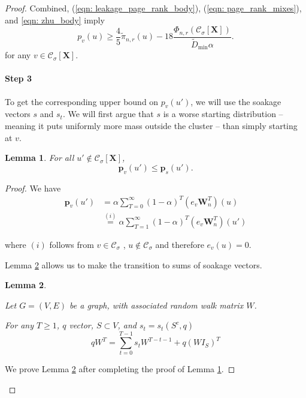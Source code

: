 \documentclass{article}
\newcommand{\1}{\mathbf{1}}
\newcommand{\pbf}{\mathbf{p}}
\newcommand{\Xbf}{\mathbf{X}}
\newcommand{\Wbf}{\mathbf{W}}
\newcommand{\Cset}{\mathcal{C}}
\newcommand{\Csig}{\Cset_{\sigma}}
\theoremstyle{aldenthm}
\newtheorem{lemma}{Lemma}
\begin{document}
\begin{proof}
	
	Combined, (\ref{eqn: leakage_page_rank_body}), (\ref{eqn: page_rank_mixes}), and \eqref{eqn: zhu_body} imply
	\begin{equation*}
	p_v(u) \geq \frac{4}{5} \widetilde{\pi}_{n,r}(u) - 18\frac{ \Phi_{n,r}(\Csig[\Xbf])}{\widetilde{D}_{\min} \alpha}.
	\end{equation*}
	for any $v \in \Csig[\Xbf]$. 
	
	\paragraph{Step 3}
	To get the corresponding upper bound on $p_v(u')$, we will use the soakage vectors $s$ and $s_t$. We will first argue that $s$ is a worse starting distribution -- meaning it puts uniformly more mass outside the cluster -- than simply starting at $v$.
	
	\begin{lemma} \label{lem: gained mass is soaked_body}
		For all $u' \notin \Csig[\Xbf]$,
		\begin{equation}
		\pbf_v(u') \leq \pbf_{s}(u').
		\end{equation}
	\end{lemma}
	
	\begin{proof}
		
		We have
		\begin{align*}
		\pbf_v(u') & = \alpha \sum_{T=0}^{\infty} (1 - \alpha)^T (e_v \Wbf_n^T)(u)\\
		& \overset{(i)}{=} \alpha \sum_{T=1}^{\infty} (1 - \alpha)^T (e_v \Wbf_n^T)(u')
		\end{align*}
		
		where $(i)$ follows from $v \in \Csig$ , $u \not\in \Csig$ and therefore $e_v(u) = 0$. 
		
		Lemma \ref{lem: sum_of_soakages} allows us to make the transition to sums of soakage vectors. 
		\begin{lemma}
			\label{lem: sum_of_soakages}
			
			Let $G = (V,E)$ be a graph, with associated random walk matrix $W$.
			
			For any $T \geq 1$, $q$ vector, $S \subset V$, and $s_t = s_t(S^c,q)$
			\begin{equation}
			qW^T = \sum_{t = 0}^{T - 1} s_t W^{T - t - 1} + q(W I_S)^T
			\end{equation}
		\end{lemma}
		We prove Lemma \ref{lem: sum_of_soakages} after completing the proof of Lemma \ref{lem: gained mass is soaked_body}.
		

\end{proof}
\end{proof}
\end{document}
